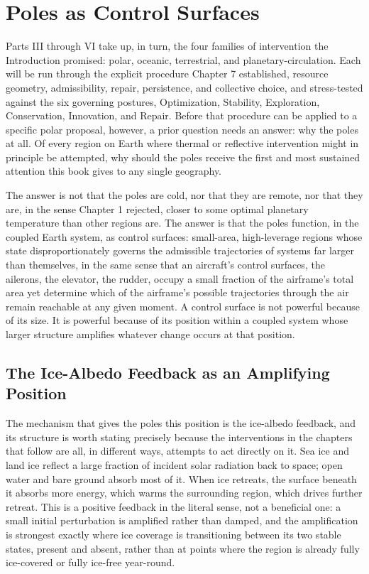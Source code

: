 \documentclass[11pt,oneside]{book}
\begin{document}
\chapter{Poles as Control Surfaces}

Parts III through VI take up, in turn, the four families of intervention the Introduction promised: polar, oceanic, terrestrial, and planetary-circulation. Each will be run through the explicit procedure Chapter 7 established, resource geometry, admissibility, repair, persistence, and collective choice, and stress-tested against the six governing postures, Optimization, Stability, Exploration, Conservation, Innovation, and Repair. Before that procedure can be applied to a specific polar proposal, however, a prior question needs an answer: why the poles at all. Of every region on Earth where thermal or reflective intervention might in principle be attempted, why should the poles receive the first and most sustained attention this book gives to any single geography.

The answer is not that the poles are cold, nor that they are remote, nor that they are, in the sense Chapter 1 rejected, closer to some optimal planetary temperature than other regions are. The answer is that the poles function, in the coupled Earth system, as control surfaces: small-area, high-leverage regions whose state disproportionately governs the admissible trajectories of systems far larger than themselves, in the same sense that an aircraft's control surfaces, the ailerons, the elevator, the rudder, occupy a small fraction of the airframe's total area yet determine which of the airframe's possible trajectories through the air remain reachable at any given moment. A control surface is not powerful because of its size. It is powerful because of its position within a coupled system whose larger structure amplifies whatever change occurs at that position.

\section*{The Ice-Albedo Feedback as an Amplifying Position}

The mechanism that gives the poles this position is the ice-albedo feedback, and its structure is worth stating precisely because the interventions in the chapters that follow are all, in different ways, attempts to act directly on it. Sea ice and land ice reflect a large fraction of incident solar radiation back to space; open water and bare ground absorb most of it. When ice retreats, the surface beneath it absorbs more energy, which warms the surrounding region, which drives further retreat. This is a positive feedback in the literal sense, not a beneficial one: a small initial perturbation is amplified rather than damped, and the amplification is strongest exactly where ice coverage is transitioning between its two stable states, present and absent, rather than at points where the region is already fully ice-covered or fully ice-free year-round.
\end{document}
